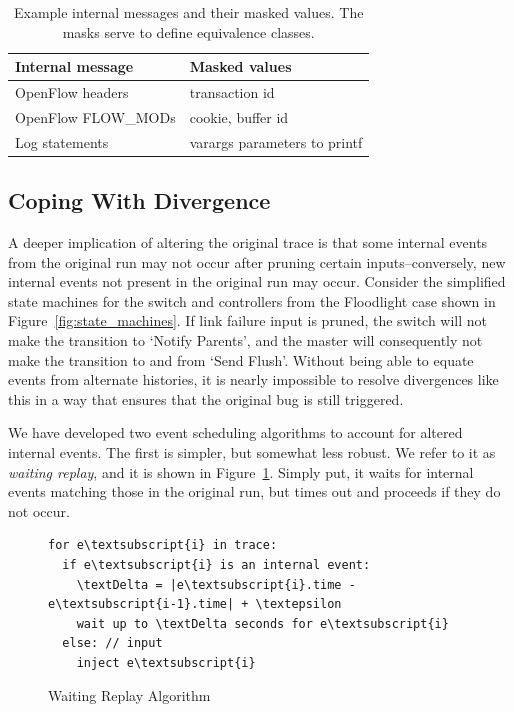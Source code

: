 \begin{table}
\centering
\begin{tabular}{|l|l|}
\hline
Internal message & Masked values \\
\hline
OpenFlow headers & transaction id\\
OpenFlow FLOW\_MODs & cookie, buffer id \\
Log statements & varargs parameters to printf \\
\hline
\end{tabular}
\caption{Example internal messages and their masked values. The masks serve to
define equivalence classes.}
\label{tab:fingerprints}
\end{table}

\subsection{Coping With Divergence}
\label{subsec:divergence}

A deeper implication of altering the original trace is that
some internal events from the original run may not occur after
pruning certain inputs--conversely, new internal events not present in the original run
may occur. Consider the simplified state machines for the switch and
controllers from the Floodlight case shown in
Figure~\ref{fig:state_machines}. If link failure input is pruned, the
switch will not make the transition to `Notify Parents', and the master will
consequently not make the transition to and from `Send Flush'. Without being
able to equate events from alternate histories, it is nearly impossible to resolve
divergences like this in a way that ensures that the original bug is still
triggered.

We have developed two event scheduling algorithms to account for altered
internal events. The first is simpler, but somewhat less robust. We refer to it as
\emph{waiting replay}, and it is shown in Figure~\ref{fig:simple_algorithm}.
Simply put, it waits for internal events matching those in the original run,
but times out and proceeds if they do not occur.

\begin{figure}
\begin{boxedminipage}{\linewidth}
\begin{Verbatim}[commandchars=\\\{\}]
for e\textsubscript{i} in trace:
  if e\textsubscript{i} is an internal event:
    \textDelta = |e\textsubscript{i}.time - e\textsubscript{i-1}.time| + \textepsilon
    wait up to \textDelta seconds for e\textsubscript{i}
  else: // input
    inject e\textsubscript{i}
\end{Verbatim}
\end{boxedminipage}
\caption{Waiting Replay Algorithm}
\label{fig:simple_algorithm}
\end{figure}

